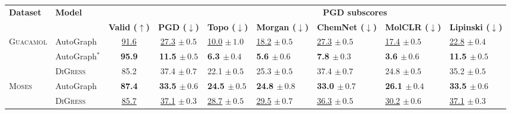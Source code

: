 \begin{tabular}{llccp{1.9cm}p{1.9cm}p{2.0cm}p{1.9cm}p{1.9cm}}%
\toprule
\textbf{Dataset} & \textbf{Model} &  &  & \multicolumn{5}{c}{{\textbf{PGD subscores}}} \\
\cmidrule(lr){5-9}
 &  & \textbf{Valid ($\uparrow$)} & \textbf{PGD ($\downarrow$)} & \textbf{Topo ($\downarrow$)} & \textbf{Morgan ($\downarrow$)} & \textbf{ChemNet ($\downarrow$)} & \textbf{MolCLR ($\downarrow$)} & \textbf{Lipinski ($\downarrow$)} \\
\midrule
\textsc{Guacamol} & AutoGraph & \underline{91.6}  & \underline{27.3} $\pm\,\scriptstyle{0.5}$ & \underline{10.0} $\pm\,\scriptstyle{1.0}$ & \underline{18.2} $\pm\,\scriptstyle{0.5}$ & \underline{27.3} $\pm\,\scriptstyle{0.5}$ & \underline{17.4} $\pm\,\scriptstyle{0.5}$ & \underline{22.8} $\pm\,\scriptstyle{0.4}$ \\
 & AutoGraph$^*$ & \bfseries 95.9 & \bfseries 11.5 $\pm\,\scriptstyle{0.5}$ & \bfseries 6.3 $\pm\,\scriptstyle{0.4}$ & \bfseries 5.6 $\pm\,\scriptstyle{0.6}$ & \bfseries 7.8 $\pm\,\scriptstyle{0.3}$ & \bfseries 3.6 $\pm\,\scriptstyle{0.6}$ & \bfseries 11.5 $\pm\,\scriptstyle{0.5}$ \\
 & \textsc{DiGress} & 85.2 & 37.4 $\pm\,\scriptstyle{0.7}$ & 22.1 $\pm\,\scriptstyle{0.5}$ & 25.3 $\pm\,\scriptstyle{0.5}$ & 37.4 $\pm\,\scriptstyle{0.7}$ & 24.8 $\pm\,\scriptstyle{0.5}$ & 35.2 $\pm\,\scriptstyle{0.5}$ \\
\midrule
\textsc{Moses} & AutoGraph & \bfseries 87.4 &  \bfseries 33.5 $\pm\,\scriptstyle{0.6}$ & \bfseries 24.5 $\pm\,\scriptstyle{0.5}$ & \bfseries 24.8 $\pm\,\scriptstyle{0.8}$ & \bfseries 33.0 $\pm\,\scriptstyle{0.7}$ & \bfseries 26.1 $\pm\,\scriptstyle{0.4}$ & \bfseries 33.5 $\pm\,\scriptstyle{0.6}$ \\
 & \textsc{DiGress} & \underline{85.7}  & \underline{37.1} $\pm\,\scriptstyle{0.3}$ & \underline{28.7} $\pm\,\scriptstyle{0.5}$ & \underline{29.5} $\pm\,\scriptstyle{0.7}$ & \underline{36.3} $\pm\,\scriptstyle{0.5}$ & \underline{30.2} $\pm\,\scriptstyle{0.6}$ & \underline{37.1} $\pm\,\scriptstyle{0.3}$ \\
\bottomrule
\end{tabular}
